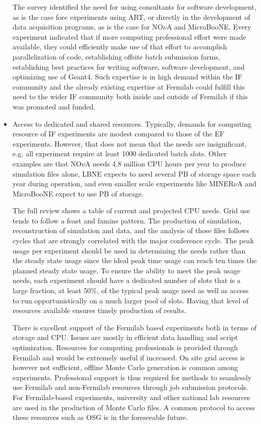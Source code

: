 \begin{itemize}
The survey identified the need for using consultants for software development, as is the case fore experiments using ART, or directly in the development of data acquisition programs, as is the case for NO$\nu$A and MicroBooNE.  Every experiment indicated that if more computing professional effort were made available, they could efficiently make use of that effort to accomplish parallelization of code, establishing offsite batch submission farms, establishing best practices for writing software, software development, and  optimizing use of Geant4. Such expertise is in high demand within the IF community and the already existing expertise at Fermilab could fulfill this need to the wider IF community both inside and outside of Fermilab if this was promoted and funded. 

\item Access to dedicated and shared resources. Typically, demands for computing resource of IF experiments are modest compared to those of the EF experiments.  However, that does not mean that the needs are insignificant, e.g. all experiment require at least 1000 dedicated batch slots. Other examples are that NO$\nu$A  needs 4.8 million CPU hours per year to produce simulation files alone, LBNE expects to need several PB of storage space each year during operation, and even smaller scale experiments like MINER$\nu$A and MicroBooNE expect to use PB of storage.

The full review shows a table of current and projected CPU needs. Grid use tends to follow a feast and famine pattern.  The production of simulation, reconstruction of simulation and data, and the analysis of those files follows cycles that are strongly correlated with the major conference cycle.  The peak usage per experiment should be used in determining the needs rather than the steady state usage since the ideal peak time usage can reach ten times the planned steady state usage. To ensure the ability to meet the peak usage needs, each experiment should have a dedicated number of slots that is a large fraction, at least 50\%, of the typical peak usage need as well as access to run opportunistically on a much larger pool of slots. Having that level of resources available ensures timely production of results. 

There is excellent support of the Fermilab based experiments both in terms of storage and CPU.  Issues are mostly in efficient data handling and script optimization. Resources for computing professionals is provided through Fermilab and would be extremely useful if increased. On site grid access is however not sufficient, offline Monte Carlo generation is common among experiments. Professional support is thus required for methods to seamlessly use Fermilab and non-Fermilab resources through job submission protocols. For Fermilab-based experiments, university and other national lab resources are used in the production of Monte Carlo files. A common protocol to access these resources such as OSG is in the foreseeable future.


\end{itemize}
